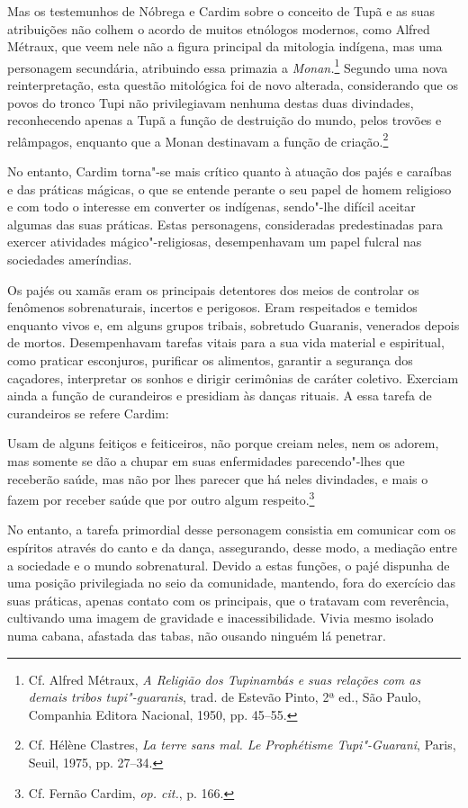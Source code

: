  Mas os testemunhos de Nóbrega e Cardim sobre o conceito de
Tupã e as suas atribuições não colhem o acordo de muitos
etnólogos modernos, como Alfred Métraux, que veem nele não a figura
principal da mitologia indígena, mas uma personagem secundária,
atribuindo essa primazia a \textit{Monan.}\footnote{ Cf. Alfred
Métraux, \textit{A Religião dos Tupinambás e suas relações com as
demais tribos tupi"-guaranis}, trad. de Estevão Pinto, 2ª ed., São
Paulo, Companhia Editora Nacional, 1950, pp. 45--55.} Segundo uma
nova reinterpretação, esta questão mitológica foi de novo alterada,
considerando que os povos do tronco Tupi não privilegiavam nenhuma
destas duas divindades, reconhecendo apenas a Tupã a função de
destruição do mundo, pelos trovões e relâmpagos, enquanto que a Monan
destinavam a função de criação.\footnote{ Cf. Hélène Clastres,
\textit{La terre sans mal. Le Prophétisme Tupi"-Guarani}, Paris, Seuil,
1975, pp. 27--34.} 

No entanto, Cardim torna"-se mais crítico quanto à atuação dos pajés
e caraíbas e das práticas mágicas, o que se entende perante o seu papel
de homem religioso e com todo o interesse em converter os indígenas,
sendo"-lhe difícil aceitar algumas das suas práticas. Estas personagens,
consideradas predestinadas para exercer atividades mágico"-religiosas,
desempenhavam um papel fulcral nas sociedades ameríndias. 

 Os pajés ou xamãs eram os principais detentores dos meios de controlar
os fenômenos sobrenaturais, incertos e perigosos. Eram respeitados e
temidos enquanto vivos e, em alguns grupos tribais, sobretudo Guaranis,
venerados depois de mortos. Desempenhavam tarefas vitais para a sua
vida material e espiritual, como praticar esconjuros, purificar os
alimentos, garantir a segurança dos caçadores, interpretar os sonhos e
dirigir cerimônias de caráter coletivo. Exerciam ainda a função de
curandeiros e presidiam às danças rituais. A essa tarefa de curandeiros
se refere Cardim: 

\begin{hedraquote}
[\ldots{}] Usam de alguns feitiços e feiticeiros, não porque
creiam neles, nem os adorem, mas somente se dão a chupar em suas
enfermidades parecendo"-lhes que receberão saúde, mas não por lhes
parecer que há neles divindades, e mais o fazem por receber saúde que
por outro algum respeito.\footnote{ Cf. Fernão Cardim, \textit{op. cit.}, p. 166.}
\end{hedraquote}

 No entanto, a tarefa primordial desse personagem consistia em
comunicar com os espíritos através do canto e da dança, assegurando,
desse modo, a mediação entre a sociedade e o mundo sobrenatural. Devido
a estas funções, o pajé dispunha de uma posição privilegiada no seio da
comunidade, mantendo, fora do exercício das suas práticas, apenas
contato com os principais, que o tratavam com reverência, cultivando
uma imagem de gravidade e inacessibilidade. Vivia mesmo isolado numa
cabana, afastada das tabas, não ousando ninguém lá penetrar.

